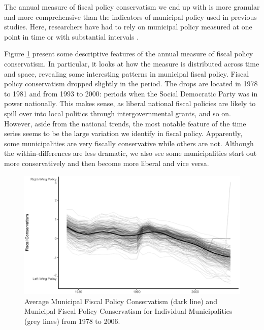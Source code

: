 \documentclass[a4paper,12pt]{article}
\begin{document}
The annual measure of fiscal policy conservatism we end up with is more granular and more comprehensive than the indicators of municipal policy used in previous studies. Here, researchers have had to rely on municipal policy measured at one point in time \citep{tausanovitch2014representation,palus2010responsiveness} or with substantial intervals \citep{sances2017voters,einstein2016pushing,hajnal2010or}. 

Figure \ref{fig:timeline} present some descriptive features of the annual measure of fiscal policy conservatism. In particular, it looks at how the measure is distributed across time and space, revealing some interesting patterns in municipal fiscal policy. Fiscal policy conservatism dropped slightly in the period. The drops are located in 1978 to 1981 and from 1993 to 2000: periods when the Social Democratic Party was in power nationally. This makes sense, as liberal national fiscal policies are likely to spill over into local politics through intergovernmental grants, and so on.  However, aside from the national trends, the most notable feature of the time series seems to be the large variation we identify in fiscal policy. Apparently, some municipalities are very fiscally conservative while others are not. Although the within-differences are less dramatic, we also see some municipalities start out more conservatively and then become more liberal and vice versa.

\begin{figure}[htbp]
	\centering 
	
	\includegraphics[width=1\textwidth]{fiscal_TimeSeries.eps}
	\caption{Average Municipal Fiscal Policy Conservatism (dark line) and Municipal Fiscal Policy Conservatism for Individual Municipalities (grey lines) from 1978 to 2006.}
	\label{fig:timeline}
	

	
\end{figure}
\end{document}
